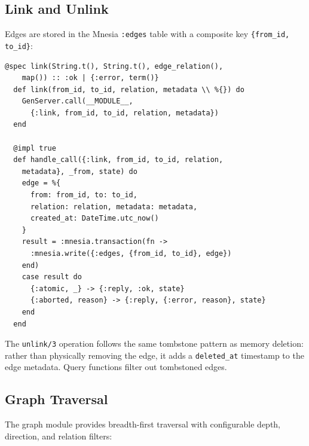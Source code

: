 \documentclass[12pt,a4paper]{article}
\theoremstyle{definition}
\begin{document}
\subsection{Link and Unlink}\label{subsec:link-unlink}

Edges are stored in the Mnesia \texttt{:edges} table with a composite key \texttt{\{from\_id, to\_id\}}:

\begin{lstlisting}[caption={Creating and soft-removing graph edges.}, label={lst:link-unlink}]
  @spec link(String.t(), String.t(), edge_relation(),
    map()) :: :ok | {:error, term()}
  def link(from_id, to_id, relation, metadata \\ %{}) do
    GenServer.call(__MODULE__,
      {:link, from_id, to_id, relation, metadata})
  end

  @impl true
  def handle_call({:link, from_id, to_id, relation,
    metadata}, _from, state) do
    edge = %{
      from: from_id, to: to_id,
      relation: relation, metadata: metadata,
      created_at: DateTime.utc_now()
    }
    result = :mnesia.transaction(fn ->
      :mnesia.write({:edges, {from_id, to_id}, edge})
    end)
    case result do
      {:atomic, _} -> {:reply, :ok, state}
      {:aborted, reason} -> {:reply, {:error, reason}, state}
    end
  end
\end{lstlisting}

The \texttt{unlink/3} operation follows the same tombstone pattern as memory deletion: rather than physically removing the edge, it adds a \texttt{deleted\_at} timestamp to the edge metadata.
Query functions filter out tombstoned edges.

\subsection{Graph Traversal}\label{subsec:graph-traversal}

The graph module provides breadth-first traversal with configurable depth, direction, and relation filters:
\end{document}
